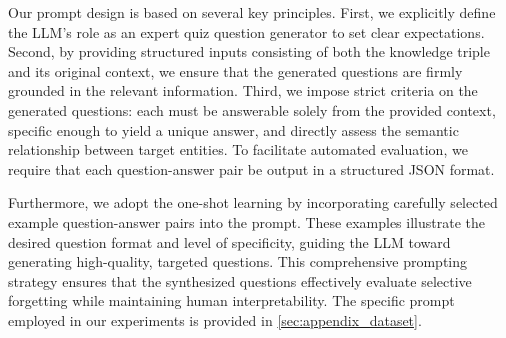 Our prompt design is based on several key principles. First, we explicitly define the LLM's role as an expert quiz question generator to set clear expectations. Second, by providing structured inputs consisting of both the knowledge triple and its original context, we ensure that the generated questions are firmly grounded in the relevant information. Third, we impose strict criteria on the generated questions: each must be answerable solely from the provided context, specific enough to yield a unique answer, and directly assess the semantic relationship between target entities. To facilitate automated evaluation, we require that each question-answer pair be output in a structured JSON format.

Furthermore, we adopt the one-shot learning by incorporating carefully selected example question-answer pairs into the prompt. These examples illustrate the desired question format and level of specificity, guiding the LLM toward generating high-quality, targeted questions. This comprehensive prompting strategy ensures that the synthesized questions effectively evaluate selective forgetting while maintaining human interpretability. The specific prompt employed in our experiments is provided in \autoref{sec:appendix_dataset}.



